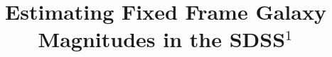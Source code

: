 \documentclass[10pt,preprint]{aastex}
\newcounter{address}
\begin{document}
 

\title{Estimating Fixed Frame Galaxy Magnitudes in the SDSS$^1$}


\end{document}
